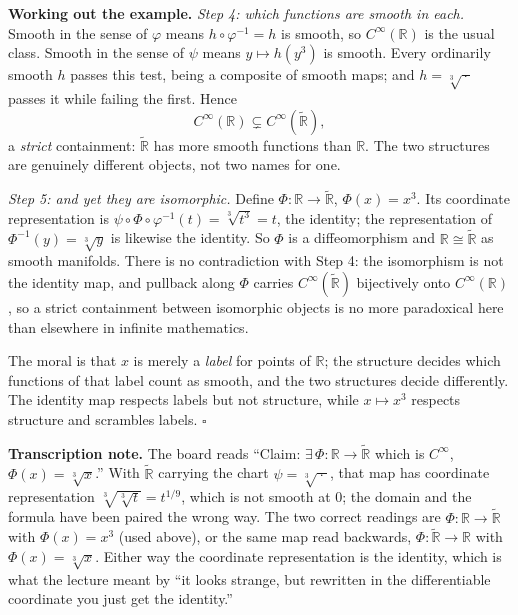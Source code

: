 \documentclass[11pt]{report}
\renewenvironment{proof}[1][Proof]{\noindent\textbf{#1.} }{\hfill$\square$\par\vspace{5pt}}
\begin{document}
\begin{proof}[Working out the example]
\emph{Step 4: which functions are smooth in each.} Smooth in the sense of $\varphi$ means $h \circ \varphi^{-1} = h$ is smooth, so $C^\infty(\mathbb{R})$ is the usual class. Smooth in the sense of $\psi$ means $y \mapsto h(y^3)$ is smooth. Every ordinarily smooth $h$ passes this test, being a composite of smooth maps; and $h = \sqrt[3]{\,\cdot\,}$ passes it while failing the first. Hence
\[
C^\infty(\mathbb{R}) \subsetneq C^\infty(\widetilde{\mathbb{R}}),
\]
a \emph{strict} containment: $\widetilde{\mathbb{R}}$ has more smooth functions than $\mathbb{R}$. The two structures are genuinely different objects, not two names for one.

\emph{Step 5: and yet they are isomorphic.} Define $\Phi : \mathbb{R} \to \widetilde{\mathbb{R}}$, $\Phi(x) = x^3$. Its coordinate representation is $\psi \circ \Phi \circ \varphi^{-1}(t) = \sqrt[3]{t^3} = t$, the identity; the representation of $\Phi^{-1}(y) = \sqrt[3]{y}$ is likewise the identity. So $\Phi$ is a diffeomorphism and $\mathbb{R} \cong \widetilde{\mathbb{R}}$ as smooth manifolds. There is no contradiction with Step 4: the isomorphism is not the identity map, and pullback along $\Phi$ carries $C^\infty(\widetilde{\mathbb{R}})$ bijectively onto $C^\infty(\mathbb{R})$, so a strict containment between isomorphic objects is no more paradoxical here than elsewhere in infinite mathematics.

The moral is that $x$ is merely a \emph{label} for points of $\mathbb{R}$; the structure decides which functions of that label count as smooth, and the two structures decide differently. The identity map respects labels but not structure, while $x \mapsto x^3$ respects structure and scrambles labels.
\end{proof}

\textbf{Transcription note.} The board reads ``Claim: $\exists\,\Phi : \mathbb{R} \to \widetilde{\mathbb{R}}$ which is $C^\infty$, $\Phi(x) = \sqrt[3]{x}$.'' With $\widetilde{\mathbb{R}}$ carrying the chart $\psi = \sqrt[3]{\ \cdot\ }$, that map has coordinate representation $\sqrt[3]{\sqrt[3]{t}} = t^{1/9}$, which is not smooth at $0$; the domain and the formula have been paired the wrong way. The two correct readings are $\Phi : \mathbb{R} \to \widetilde{\mathbb{R}}$ with $\Phi(x) = x^3$ (used above), or the same map read backwards, $\Phi : \widetilde{\mathbb{R}} \to \mathbb{R}$ with $\Phi(x) = \sqrt[3]{x}$. Either way the coordinate representation is the identity, which is what the lecture meant by ``it looks strange, but rewritten in the differentiable coordinate you just get the identity.''
\end{document}

